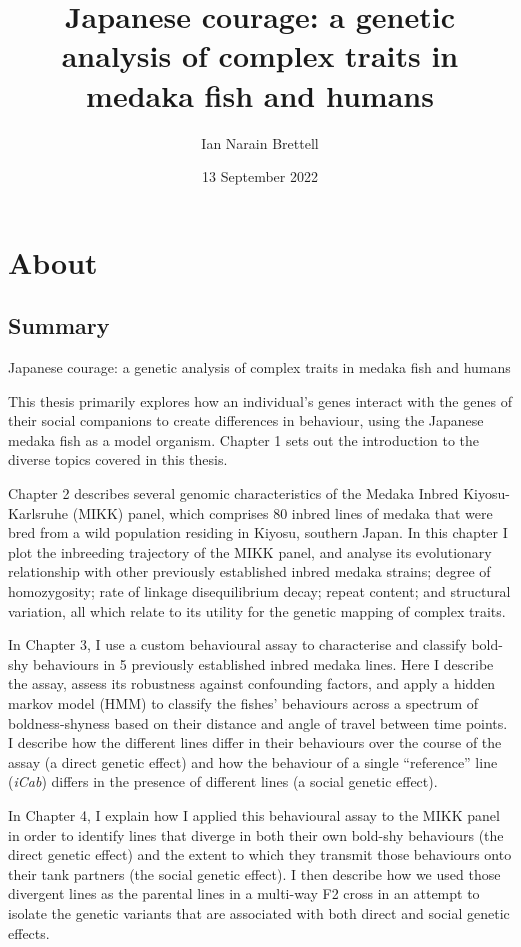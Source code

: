 \documentclass[
]{book}
\title{Japanese courage: a genetic analysis of complex traits in medaka fish and humans}
\author{Ian Narain Brettell}
\date{13 September 2022}
\begin{document}
\maketitle

{
\setcounter{tocdepth}{1}
\tableofcontents
}
\hypertarget{about}{%
\chapter*{About}\label{about}}

\hypertarget{summary}{%
\section{Summary}\label{summary}}

Japanese courage: a genetic analysis of complex traits in medaka fish and humans

This thesis primarily explores how an individual's genes interact with the genes of their social companions to create differences in behaviour, using the Japanese medaka fish as a model organism. Chapter 1 sets out the introduction to the diverse topics covered in this thesis.

Chapter 2 describes several genomic characteristics of the Medaka Inbred Kiyosu-Karlsruhe (MIKK) panel, which comprises 80 inbred lines of medaka that were bred from a wild population residing in Kiyosu, southern Japan. In this chapter I plot the inbreeding trajectory of the MIKK panel, and analyse its evolutionary relationship with other previously established inbred medaka strains; degree of homozygosity; rate of linkage disequilibrium decay; repeat content; and structural variation, all which relate to its utility for the genetic mapping of complex traits.

In Chapter 3, I use a custom behavioural assay to characterise and classify bold-shy behaviours in 5 previously established inbred medaka lines. Here I describe the assay, assess its robustness against confounding factors, and apply a hidden markov model (HMM) to classify the fishes' behaviours across a spectrum of boldness-shyness based on their distance and angle of travel between time points. I describe how the different lines differ in their behaviours over the course of the assay (a direct genetic effect) and how the behaviour of a single ``reference'' line (\emph{iCab}) differs in the presence of different lines (a social genetic effect).

In Chapter 4, I explain how I applied this behavioural assay to the MIKK panel in order to identify lines that diverge in both their own bold-shy behaviours (the direct genetic effect) and the extent to which they transmit those behaviours onto their tank partners (the social genetic effect). I then describe how we used those divergent lines as the parental lines in a multi-way F2 cross in an attempt to isolate the genetic variants that are associated with both direct and social genetic effects.
\end{document}
